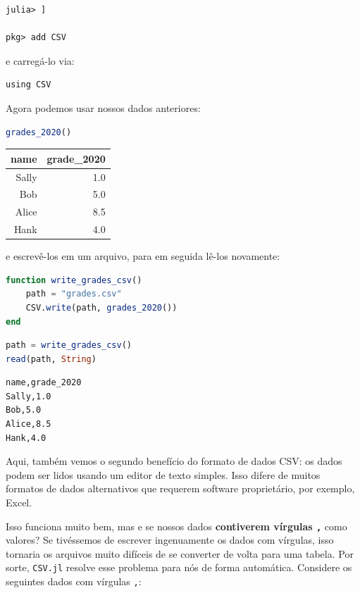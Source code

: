 \documentclass[
  notoc %
]{tufte-book}
\newcommand{\passthrough}[1]{#1}
\begin{document}
\begin{lstlisting}
julia> ]

pkg> add CSV
\end{lstlisting}

e carregá-lo via:

\begin{lstlisting}
using CSV
\end{lstlisting}

Agora podemos usar nossos dados anteriores:

\begin{lstlisting}[language=Julia]
grades_2020()
\end{lstlisting}

\begin{longtable}[]{@{}rr@{}}
\toprule
name & grade\_2020 \\
\midrule
\endhead
Sally & 1.0 \\
Bob & 5.0 \\
Alice & 8.5 \\
Hank & 4.0 \\
\bottomrule
\end{longtable}

e escrevê-los em um arquivo, para em seguida lê-los novamente:

\begin{lstlisting}[language=Julia]
function write_grades_csv()
    path = "grades.csv"
    CSV.write(path, grades_2020())
end
\end{lstlisting}

\begin{lstlisting}[language=Julia]
path = write_grades_csv()
read(path, String)
\end{lstlisting}

\begin{lstlisting}[language=Output]
name,grade_2020
Sally,1.0
Bob,5.0
Alice,8.5
Hank,4.0

\end{lstlisting}

Aqui, também vemos o segundo benefício do formato de dados CSV: os dados
podem ser lidos usando um editor de texto simples. Isso difere de muitos
formatos de dados alternativos que requerem software proprietário, por
exemplo, Excel.

Isso funciona muito bem, mas e se nossos dados \textbf{contiverem
vírgulas \passthrough{\lstinline!,!}} como valores? Se tivéssemos de
escrever ingenuamente os dados com vírgulas, isso tornaria os arquivos
muito difíceis de se converter de volta para uma tabela. Por sorte,
\passthrough{\lstinline!CSV.jl!} resolve esse problema para nós de forma
automática. Considere os seguintes dados com vírgulas
\passthrough{\lstinline!,!}:
\end{document}
